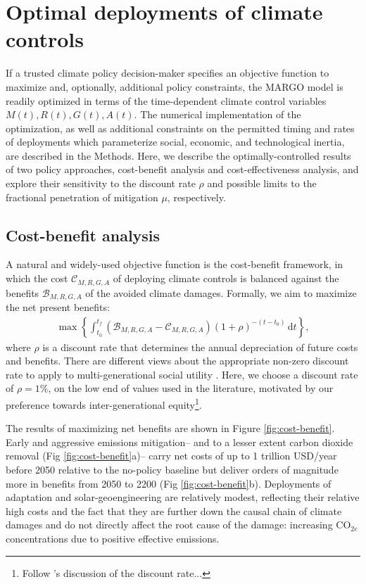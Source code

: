 \documentclass[9pt,twocolumn,twoside,lineno]{pnas-new}
\begin{document}
\section*{Optimal deployments of climate controls}\label{sec:optimal-deployment}

If a trusted climate policy decision-maker specifies an objective function to maximize and, optionally, additional policy constraints, the MARGO model is readily optimized in terms of the time-dependent climate control variables $M(t), R(t), G(t), A(t)$. The numerical implementation of the optimization, as well as additional constraints on the permitted timing and rates of deployments which parameterize social, economic, and technological inertia, are described in the Methods. Here, we describe the optimally-controlled results of two policy approaches, cost-benefit analysis and cost-effectiveness analysis, and explore their sensitivity to the discount rate $\rho$ and possible limits to the fractional penetration of mitigation $\mu$, respectively.

\subsection*{Cost-benefit analysis}\label{sec:cost-benefit}

A natural and widely-used objective function is the cost-benefit framework, in which the cost $\mathcal{C}_{M, R, G, A}$ of deploying climate controls is balanced against the benefits $\mathcal{B}_{M, R, G, A}$ of the avoided climate damages. Formally, we aim to maximize the net present benefits:
\begin{gather}
    \max \left\{ \int_{t_{0}}^{t_{f}} 
    \left(\mathcal{B}_{M, R, G, A} - \mathcal{C}_{M, R, G, A} \right) (1 + \rho)^{-(t-t_{0})} \, \text{d}t \right\},
    \label{eq:net-present-benefits}
\end{gather}
where $\rho$ is a discount rate that determines the annual depreciation of future costs and benefits. There are different views about the appropriate non-zero discount rate to apply to multi-generational social utility \cite{ramsey_mathematical_1928, solow_economics_1974, stern_economics_2007}. Here, we choose a discount rate of $\rho = 1\%$, on the low end of values used in the literature, motivated by our preference towards inter-generational equity\footnote{Follow \cite{stern_economics_2007}'s discussion of the discount rate...}.

The results of maximizing net benefits are shown in Figure \ref{fig:cost-benefit}. Early and aggressive emissions mitigation– and to a lesser extent carbon dioxide removal (Fig \ref{fig:cost-benefit}a)– carry net costs of up to 1 trillion USD/year before 2050 relative to the no-policy baseline but deliver orders of magnitude more in benefits from 2050 to 2200 (Fig \ref{fig:cost-benefit}b). Deployments of adaptation and solar-geoengineering are relatively modest, reflecting their relative high costs and the fact that they are further down the causal chain of climate damages and do not directly affect the root cause of the damage: increasing CO$_{2e}$ concentrations due to positive effective emissions.
\end{document}
